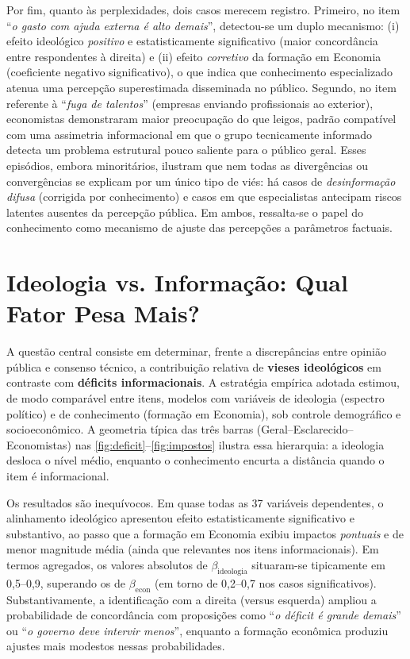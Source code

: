 Por fim, quanto às perplexidades, dois casos merecem registro. Primeiro, no item ``\textit{o gasto com ajuda externa é alto demais}'', detectou-se um duplo mecanismo: (i) efeito ideológico \textit{positivo} e estatisticamente significativo (maior concordância entre respondentes à direita) e (ii) efeito \textit{corretivo} da formação em Economia (coeficiente negativo significativo), o que indica que conhecimento especializado atenua uma percepção superestimada disseminada no público. Segundo, no item referente à ``\textit{fuga de talentos}'' (empresas enviando profissionais ao exterior), economistas demonstraram maior preocupação do que leigos, padrão compatível com uma assimetria informacional em que o grupo tecnicamente informado detecta um problema estrutural pouco saliente para o público geral. Esses episódios, embora minoritários, ilustram que nem todas as divergências ou convergências se explicam por um único tipo de viés: há casos de \textit{desinformação difusa} (corrigida por conhecimento) e casos em que especialistas antecipam riscos latentes ausentes da percepção pública. Em ambos, ressalta-se o papel do conhecimento como mecanismo de ajuste das percepções a parâmetros factuais.

\section{Ideologia vs. Informação: Qual Fator Pesa Mais?}

A questão central consiste em determinar, frente a discrepâncias entre opinião pública e consenso técnico, a contribuição relativa de \textbf{vieses ideológicos} em contraste com \textbf{déficits informacionais}. A estratégia empírica adotada estimou, de modo comparável entre itens, modelos com variáveis de ideologia (espectro político) e de conhecimento (formação em Economia), sob controle demográfico e socioeconômico. A geometria típica das três barras (Geral–Esclarecido–Economistas) nas \autoref{fig:deficit}–\autoref{fig:impostos} ilustra essa hierarquia: a ideologia desloca o nível médio, enquanto o conhecimento encurta a distância quando o item é informacional.

Os resultados são inequívocos. Em quase todas as 37 variáveis dependentes, o alinhamento ideológico apresentou efeito estatisticamente significativo e substantivo, ao passo que a formação em Economia exibiu impactos \textit{pontuais} e de menor magnitude média (ainda que relevantes nos itens informacionais). Em termos agregados, os valores absolutos de $\beta_{\text{ideologia}}$ situaram-se tipicamente em 0{,}5--0{,}9, superando os de $\beta_{\text{econ}}$ (em torno de 0{,}2--0{,}7 nos casos significativos). Substantivamente, a identificação com a direita (versus esquerda) ampliou a probabilidade de concordância com proposições como ``\textit{o déficit é grande demais}'' ou ``\textit{o governo deve intervir menos}'', enquanto a formação econômica produziu ajustes mais modestos nessas probabilidades.

